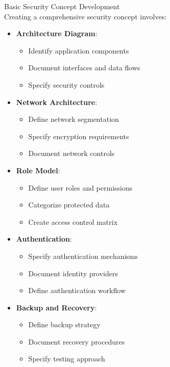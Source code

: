 \begin{concept}{Basic Security Concept Development}\\
Creating a comprehensive security concept involves:
\begin{itemize}
    \item \textbf{Architecture Diagram}:
    \begin{itemize}
        \item Identify application components
        \item Document interfaces and data flows
        \item Specify security controls
    \end{itemize}
    \item \textbf{Network Architecture}:
    \begin{itemize}
        \item Define network segmentation
        \item Specify encryption requirements
        \item Document network controls
    \end{itemize}
    \item \textbf{Role Model}:
    \begin{itemize}
        \item Define user roles and permissions
        \item Categorize protected data
        \item Create access control matrix
    \end{itemize}
    \item \textbf{Authentication}:
    \begin{itemize}
        \item Specify authentication mechanisms
        \item Document identity providers
        \item Define authentication workflow
    \end{itemize}
    \item \textbf{Backup and Recovery}:
    \begin{itemize}
        \item Define backup strategy
        \item Document recovery procedures
        \item Specify testing approach
    \end{itemize}
\end{itemize}
\end{concept}

